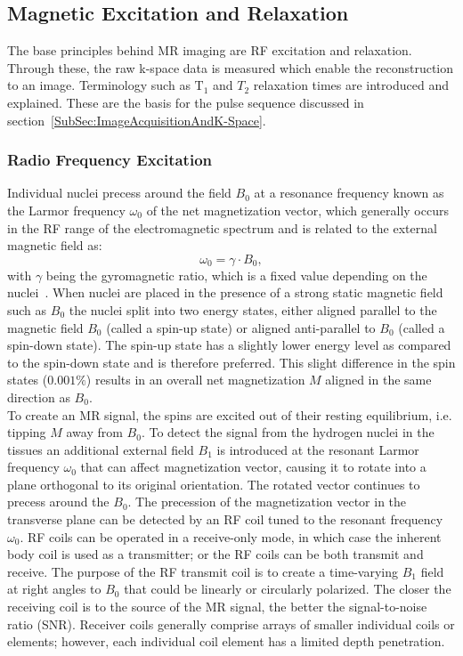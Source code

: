 \subsection{Magnetic Excitation and Relaxation} \label{SubSec:MagneticExcitationAndRelaxation}
The base principles behind MR imaging are RF excitation and relaxation. Through these, the raw k-space data is measured which enable the reconstruction to an image. Terminology such as $\text{T}_1$ and $T_2$ relaxation times are introduced and explained. These are the basis for the pulse sequence discussed in section~\ref{SubSec:ImageAcquisitionAndK-Space}.

\subsubsection{Radio Frequency Excitation}
Individual nuclei precess around the field $B_0$ at a
resonance frequency known as the Larmor frequency $\omega_0$ of the net magnetization vector, which generally occurs in the RF range of the electromagnetic spectrum and is related to the external magnetic field as:
\begin{equation} \label{eq:LarmorFrequency}
	\omega_0 = \gamma \cdot B_0,
\end{equation}
with $\gamma$ being the gyromagnetic ratio, which is a fixed value depending on the nuclei~\cite{SamplingStrategies}. When nuclei are placed in the presence of a strong static magnetic field such as $B_0$ the nuclei split into two energy states, either aligned parallel to the magnetic field $B_0$ (called a spin-up state) or aligned anti-parallel to $B_0$ (called a spin-down state). The spin-up state has a slightly lower energy level as compared to the spin-down state and is therefore preferred. This slight difference in the spin states ($0.001\%$) results in an overall net magnetization $M$ aligned in the same direction as $B_0$. \\
To create an MR signal, the spins are excited out of their resting equilibrium, i.e. tipping $M$ away from $B_0$. To detect the signal from the hydrogen nuclei in the tissues an additional external field $B_1$ is introduced at the resonant Larmor frequency $\omega_0$ that can affect magnetization vector, causing it to rotate into a plane orthogonal to its original orientation. The rotated vector continues to precess around the $B_0$. The precession of the magnetization vector in the transverse plane can be detected by an RF coil tuned to the resonant frequency $\omega_0$. RF coils can be operated in a receive-only mode, in which case the inherent body coil is used as a transmitter; or the RF coils can be both transmit and receive. The purpose of the RF transmit coil is to create a time-varying $B_1$ field at right angles to $B_0$ that could be linearly or circularly polarized. The closer the receiving coil is to the source of the MR signal, the better the signal-to-noise ratio (SNR). Receiver coils generally comprise arrays of smaller individual coils or elements; however, each individual coil element has a limited depth penetration. \\

